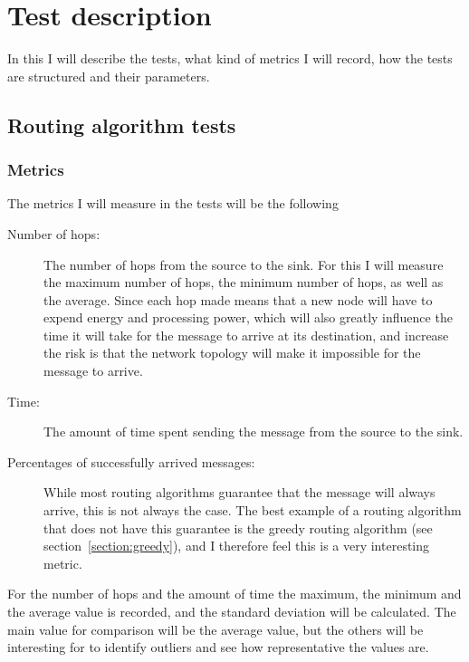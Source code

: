 \section{Test description}
\label{section:test_description}

In this I will describe the tests, what kind of metrics I will record, how the tests are structured and their parameters.

\subsection{Routing algorithm tests}
\label{section:routing_algo}

\subsubsection{Metrics}

The metrics I will measure in the tests will be the following
\begin{description}
\item[Number of hops:] The number of hops from the source to the sink. For this I will measure the maximum number of hops, the minimum number of hops, as well as the average. Since each hop made means that a new node will have to expend energy and processing power, which will also greatly influence the time it will take for the message to arrive at its destination, and increase the risk is that the network topology will make it impossible for the message to arrive.

\item[Time:] The amount of time spent sending the message from the source to the sink. 

\item[Percentages of successfully arrived messages:] While most routing algorithms guarantee that the message will always arrive, this is not always the case. The best example of a routing algorithm that does not have this guarantee is the greedy routing algorithm (see section~\ref{section:greedy}), and I therefore feel this is a very interesting metric.
\end{description}

For the number of hops and the amount of time the maximum, the minimum and the average value is recorded, and the standard deviation will be calculated. The main value for comparison will be the average value, but the others will be interesting for to identify outliers and see how representative the values are.

